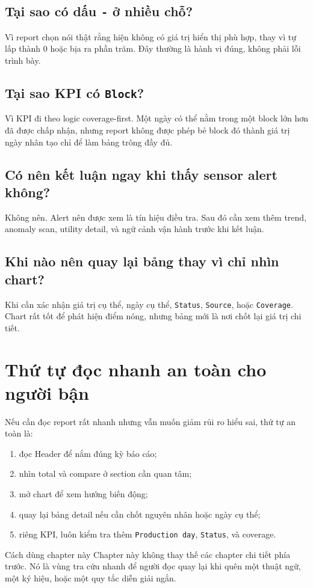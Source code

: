 \subsection{Tại sao có dấu \texttt{-} ở nhiều chỗ?}

Vì report chọn nói thật rằng hiện không có giá trị hiển thị phù hợp, thay vì tự lấp thành 0 hoặc bịa ra phần trăm. Đây thường là hành vi đúng, không phải lỗi trình bày.

\subsection{Tại sao KPI có \texttt{Block}?}

Vì KPI đi theo logic coverage-first. Một ngày có thể nằm trong một block lớn hơn đã được chấp nhận, nhưng report không được phép bẻ block đó thành giá trị ngày nhân tạo chỉ để làm bảng trông đầy đủ.

\subsection{Có nên kết luận ngay khi thấy sensor alert không?}

Không nên. Alert nên được xem là tín hiệu điều tra. Sau đó cần xem thêm trend, anomaly scan, utility detail, và ngữ cảnh vận hành trước khi kết luận.

\subsection{Khi nào nên quay lại bảng thay vì chỉ nhìn chart?}

Khi cần xác nhận giá trị cụ thể, ngày cụ thể, \texttt{Status}, \texttt{Source}, hoặc \texttt{Coverage}. Chart rất tốt để phát hiện điểm nóng, nhưng bảng mới là nơi chốt lại giá trị chi tiết.

\section{Thứ tự đọc nhanh an toàn cho người bận}

Nếu cần đọc report rất nhanh nhưng vẫn muốn giảm rủi ro hiểu sai, thứ tự an toàn là:

\begin{enumerate}[label=-]
\item đọc Header để nắm đúng kỳ báo cáo;
\item nhìn total và compare ở section cần quan tâm;
\item mở chart để xem hướng biến động;
\item quay lại bảng detail nếu cần chốt nguyên nhân hoặc ngày cụ thể;
\item riêng KPI, luôn kiểm tra thêm \texttt{Production day}, \texttt{Status}, và coverage.
\end{enumerate}

\begin{ReaderNote}{Cách dùng chapter này}
Chapter này không thay thế các chapter chi tiết phía trước. Nó là vùng tra cứu nhanh để người đọc quay lại khi quên một thuật ngữ, một ký hiệu, hoặc một quy tắc diễn giải ngắn.
\end{ReaderNote}
